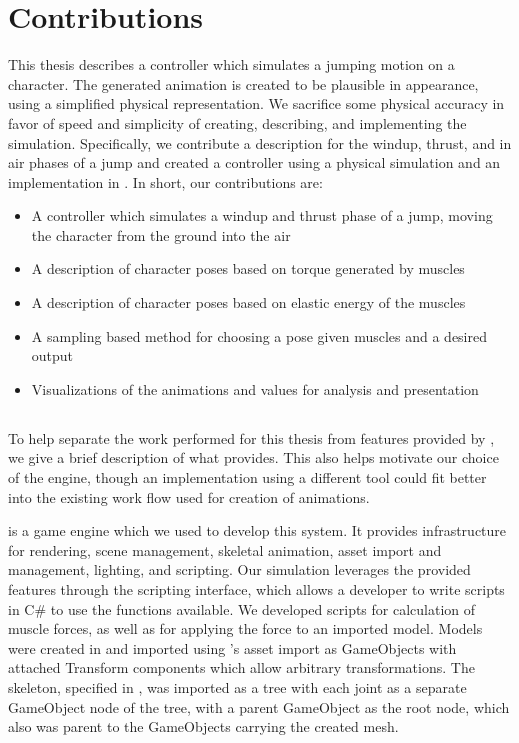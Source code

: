 \section{Contributions}
	This thesis describes a controller which simulates a jumping motion on a character.  The generated animation is created to be plausible in appearance, using a simplified physical representation.  We sacrifice some physical accuracy in favor of speed and simplicity of creating, describing, and implementing the simulation.  Specifically, we contribute a description for the windup, thrust, and in air phases of a jump and created a controller using a physical simulation and an implementation in \unity{}.  In short, our contributions are:
	\begin{itemize}
		\item A controller which simulates a windup and thrust phase of a jump, moving the character from the ground into the air
		\item A description of character poses based on torque generated by muscles
		\item A description of character poses based on elastic energy of the muscles
		\item A sampling based method for choosing a pose given muscles and a desired output
		\item Visualizations of the animations and values for analysis and presentation
	\end{itemize}

\subsection{\unity{}}
	To help separate the work performed for this thesis from features provided by \unity{}, we give a brief description of what \unity{} provides.  This also helps motivate our choice of the engine, though an implementation using a different tool could fit better into the existing work flow used for creation of animations.
	
	\unity{} is a game engine which we used to develop this system.  It provides infrastructure for rendering, scene management, skeletal animation, asset import and management, lighting, and scripting.  Our simulation leverages the provided features through the \unity{} scripting interface, which allows a developer to write scripts in C\# to use the functions available.  We developed scripts for calculation of muscle forces, as well as for applying the force to an imported model.  Models were created in \maya{} and imported using \unity{}'s asset import as \unity{} GameObjects with attached Transform components which allow arbitrary transformations.  The skeleton, specified in \maya{}, was imported as a tree with each joint as a separate GameObject node of the tree, with a parent GameObject as the root node, which also was parent to the GameObjects carrying the created mesh.
	
